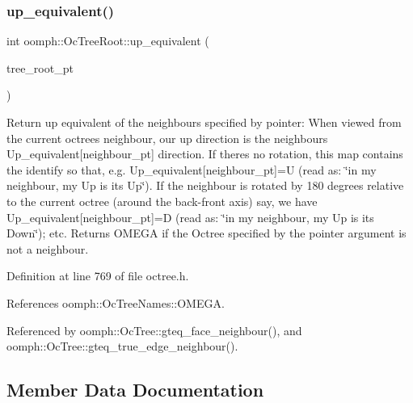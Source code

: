 \subsubsection{\texorpdfstring{up\+\_\+equivalent()}{up\_equivalent()}}
{\footnotesize\ttfamily int oomph\+::\+Oc\+Tree\+Root\+::up\+\_\+equivalent (\begin{DoxyParamCaption}\item[{\hyperlink{classoomph_1_1TreeRoot}{Tree\+Root} $\ast$}]{tree\+\_\+root\+\_\+pt }\end{DoxyParamCaption})\hspace{0.3cm}{\ttfamily [inline]}}



Return up equivalent of the neighbours specified by pointer\+: When viewed from the current octree\textquotesingle{}s neighbour, our up direction is the neighbour\textquotesingle{}s Up\+\_\+equivalent\mbox{[}neighbour\+\_\+pt\mbox{]} direction. If there\textquotesingle{}s no rotation, this map contains the identify so that, e.\+g. {\ttfamily Up\+\_\+equivalent}\mbox{[}neighbour\+\_\+pt\mbox{]}=U (read as\+: \char`\"{}in my
neighbour, my Up is its Up\char`\"{}). If the neighbour is rotated by 180 degrees relative to the current octree (around the back-\/front axis) say, we have {\ttfamily Up\+\_\+equivalent}\mbox{[}neighbour\+\_\+pt\mbox{]}=D (read as\+: \char`\"{}in my 
neighbour, my Up is its Down\char`\"{}); etc. Returns O\+M\+E\+GA if the Octree specified by the pointer argument is not a neighbour. 



Definition at line 769 of file octree.\+h.



References oomph\+::\+Oc\+Tree\+Names\+::\+O\+M\+E\+GA.



Referenced by oomph\+::\+Oc\+Tree\+::gteq\+\_\+face\+\_\+neighbour(), and oomph\+::\+Oc\+Tree\+::gteq\+\_\+true\+\_\+edge\+\_\+neighbour().



\subsection{Member Data Documentation}
\mbox{\label{classoomph_1_1OcTreeRoot_afa562a1888008194b352be57f2c3d9a9}} 
